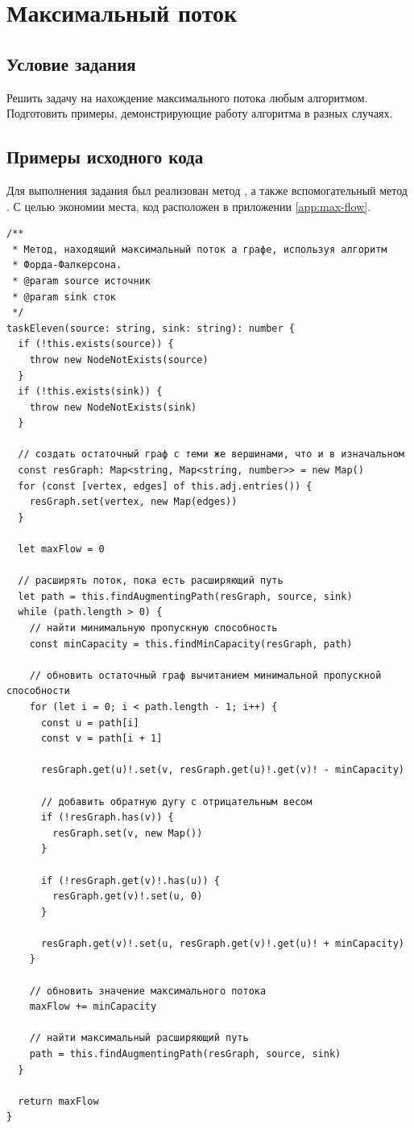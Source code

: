 \section{Максимальный поток}
\subsection{Условие задания}
Решить задачу на нахождение максимального потока любым алгоритмом.
Подготовить примеры, демонстрирующие работу алгоритма в разных случаях.

\subsection{Примеры исходного кода}
Для выполнения задания был реализован метод
, а также вспомогательный метод
. С целью экономии места,
код  расположен в приложении
\ref{app:max-flow}.
\begin{verbatim}
/**
 * Метод, находящий максимальный поток а графе, используя алгоритм
 * Форда-Фалкерсона.
 * @param source источник
 * @param sink сток
 */
taskEleven(source: string, sink: string): number {
  if (!this.exists(source)) {
    throw new NodeNotExists(source)
  }
  if (!this.exists(sink)) {
    throw new NodeNotExists(sink)
  }

  // создать остаточный граф с теми же вершинами, что и в изначальном
  const resGraph: Map<string, Map<string, number>> = new Map()
  for (const [vertex, edges] of this.adj.entries()) {
    resGraph.set(vertex, new Map(edges))
  }

  let maxFlow = 0

  // расширять поток, пока есть расширяющий путь
  let path = this.findAugmentingPath(resGraph, source, sink)
  while (path.length > 0) {
    // найти минимальную пропускную способность
    const minCapacity = this.findMinCapacity(resGraph, path)

    // обновить остаточный граф вычитанием минимальной пропускной способности
    for (let i = 0; i < path.length - 1; i++) {
      const u = path[i]
      const v = path[i + 1]

      resGraph.get(u)!.set(v, resGraph.get(u)!.get(v)! - minCapacity)

      // добавить обратную дугу с отрицательным весом
      if (!resGraph.has(v)) {
        resGraph.set(v, new Map())
      }

      if (!resGraph.get(v)!.has(u)) {
        resGraph.get(v)!.set(u, 0)
      }

      resGraph.get(v)!.set(u, resGraph.get(v)!.get(u)! + minCapacity)
    }

    // обновить значение максимального потока
    maxFlow += minCapacity

    // найти максимальный расширяющий путь
    path = this.findAugmentingPath(resGraph, source, sink)
  }

  return maxFlow
}
\end{verbatim}

